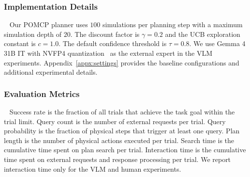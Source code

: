 \subsubsection{Implementation Details}~\label{exp:details}
Our POMCP planner uses $100$ simulations per planning step with a maximum simulation depth of $20$. The discount factor is $\gamma=0.2$ and the UCB exploration constant is $c=1.0$. The default confidence threshold is $\tau=0.8$. We use Gemma 4 31B IT with NVFP4 quantization~\citep{gemmateam2026gemma4} as the external expert in the VLM experiments. Appendix~\ref{appx:settings} provides the baseline configurations and additional experimental details.

\subsubsection{Evaluation Metrics}~\label{exp:metrics}
Success rate is the fraction of all trials that achieve the task goal within the trial limit. Query count is the number of external requests per trial. Query probability is the fraction of physical steps that trigger at least one query. Plan length is the number of physical actions executed per trial. Search time is the cumulative time spent on plan search per trial. Interaction time is the cumulative time spent on external requests and response processing per trial. We report interaction time only for the VLM and human experiments.
